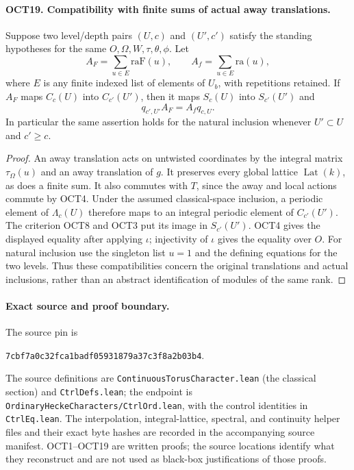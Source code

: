 \documentclass[11pt,a4paper]{article}
\numberwithin{equation}{section}
\theoremstyle{remark}\newtheorem{remark}[theorem]{Remark}
\begin{document}
\paragraph{OCT19. Compatibility with finite sums of actual away translations.}
\label{claim:OCT19}
Suppose two level/depth pairs $(U,\allowbreak{} c)$ and $(U',\allowbreak{} c')$ satisfy
the standing hypotheses for the same $O,\Omega,\allowbreak{} W,\tau,
\theta,\phi$.  Let
\[
       A_F=\sum_{u\in E}\mathrm{raF}(u),\qquad
       A_f=\sum_{u\in E}\mathrm{ra}(u),
\]
where $E$ is any finite indexed list of elements of $U_b$,
with repetitions retained.  If $A_F$ maps $C_c(U)$ into
$C_{c'}(U')$, then it maps $S_c(U)$ into $S_{c'}(U')$ and
\[
                         q_{c',\allowbreak{} U'}A_F=A_f q_{c,\allowbreak{} U}.
\]
In particular the same assertion holds for the natural
inclusion whenever $U'\subset U$ and $c'\geq c$.
\begin{proof}
An away translation acts on untwisted coordinates by the
integral matrix $\tau_\Omega(u)$ and an away translation
of $g$.  It preserves every global lattice
$\operatorname{Lat}(k)$, as does a finite sum.  It also
commutes with $T$, since the away and local actions commute
by OCT4.  Under the assumed classical-space inclusion, a
periodic element of $\Lambda_c(U)$ therefore maps to an
integral periodic element of $C_{c'}(U')$.  The criterion
OCT8 and OCT3 put its image in $S_{c'}(U')$.
OCT4 gives the displayed equality after applying $\iota$;
injectivity of $\iota$ gives the equality over $O$.
For natural inclusion use the singleton list $u=1$ and
the defining equations for the two levels.  Thus these
compatibilities concern the original translations and
actual inclusions, rather than an abstract identification
of modules of the same rank.
\end{proof}

\paragraph{Exact source and proof boundary.}
The source pin is
\begin{center}
\texttt{7cbf7a0c32fca1badf05931879a37c3f8a2b03b4}.
\end{center}
The source definitions are
\texttt{Continuous\allowbreak Torus\allowbreak Character.\allowbreak lean} (the classical section)
and \texttt{Ctrl\allowbreak Defs.\allowbreak lean}; the endpoint is
\texttt{Ordinary\allowbreak Hecke\allowbreak Characters/\allowbreak Ctrl\allowbreak Ord.\allowbreak lean}, with the control
identities in \texttt{Ctrl\allowbreak Eq.\allowbreak lean}.  The interpolation,
integral-lattice, spectral, and continuity helper files and
their exact byte hashes are recorded in the accompanying
source manifest.  OCT1--OCT19 are written proofs; the source
locations identify what they reconstruct and are not used
as black-box justifications of those proofs.
\end{document}
